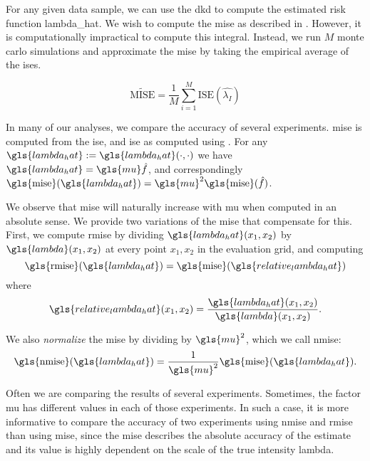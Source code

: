 For any given data sample, we can use the \gls{dkd} to compute the estimated risk function \gls{lambda_hat}.
We wish to compute the \gls{mise} as described in .
However, it is computationally impractical to compute this integral.
Instead,
we run $M$ monte carlo simulations and approximate the \gls{mise} by taking the empirical average of the \glspl{ise}.

\begin{equation}
    \label{eq:mise_tilde}
    \widetilde{\mbox{MISE}} = \frac{1}{M} \sum_{i=1}^{M} \mbox{ISE}(\hat{\lambda_I})
\end{equation}

In many of our analyses, we compare the accuracy of several experiments.
\gls{mise} is computed from the \gls{ise},
and \gls{ise} as computed using .
For any $\gls{lambda_hat} := \gls{lambda_hat}\dotdot$ we have $\gls{lambda_hat} = \gls{mu} \hat f $,
and correspondingly $ \mbox{\gls{mise}}(\gls{lambda_hat}) = \gls{mu}^2 \mbox{\gls{mise}}(\hat f) $.

We observe that \gls{mise} will naturally increase with \gls{mu} when computed in an absolute sense.
We provide two variations of the \gls{mise} that compensate for this.
First, we compute \gls{rmise} by dividing $\gls{lambda_hat}\xvec$ by $\gls{lambda}\xvec$ at every point $x_1, x_2$ in the evaluation grid, and computing
\begin{equation}
\label{eq:rmise}
    \mbox{\gls{rmise}}(\gls{lambda_hat}) = 
        \mbox{\gls{mise}}(\gls{relative_lambda_hat})
\end{equation}
where
\begin{equation}
\label{eq:relative_lambda_hat}
    \gls{relative_lambda_hat}\xvec = 
        \frac{\gls{lambda_hat}\xvec}{\gls{lambda}\xvec}
        \text{.}
\end{equation}

We also \textit{normalize} the \gls{mise} by dividing by $\gls{mu}^2$,
which we call \gls{nmise}:
\begin{equation}
\label{eq:nmise}
    \mbox{\gls{nmise}}(\gls{lambda_hat}) = 
        \frac{1}{\gls{mu}^2} \mbox{\gls{mise}}(\gls{lambda_hat}) \text{.}
\end{equation}

Often we are comparing the results of several experiments.
Sometimes, the \gls{factor} \gls{mu} has different values in each of those experiments.
In such a case, it is more informative to compare the accuracy of two experiments using \gls{nmise} and \gls{rmise} than using \gls{mise},
since the \gls{mise} describes the absolute accuracy of the estimate and its value is highly dependent on the scale of the true intensity \gls{lambda}.

